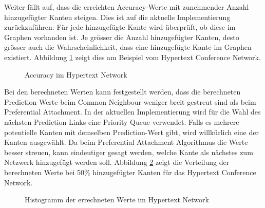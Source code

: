 Weiter fällt auf, dass die erreichten Accuracy-Werte mit zunehmender Anzahl hinzugefügter Kanten steigen.
Dies ist auf die aktuelle Implementierung zurückzuführen: Für jede hinzugefügte Kante wird überprüft, ob diese im Graphen vorhanden ist.
Je grösser die Anzahl hinzugefügter Kanten, desto grösser auch die Wahrscheinlichkeit, dass eine hinzugefügte Kante im Graphen existiert.
Abbildung \ref{fig_hypertext} zeigt dies am Beispiel vom Hypertext Conference Network.

\begin{figure}[h]
\centering
{}
\label{fig_hypertext}
\caption{Accuracy im Hypertext Network}
\end{figure}

Bei den berechneten Werten kann festgestellt werden, dass die berechneten Prediction-Werte beim Common Neighbour weniger breit gestreut sind als beim Preferential Attachment.
In der aktuellen Implementierung wird für die Wahl des nächsten Prediction Links eine Priority Queue verwendet. Falls es mehrere potentielle Kanten mit demselben Prediction-Wert gibt, wird willkürlich eine der Kanten ausgewählt.
Da beim Preferential Attachment Algorithmus die Werte besser streuen, kann eindeutiger gesagt werden, welche Kante als nächstes zum Netzwerk hinzugefügt werden soll.
Abbildung \ref{fig_histogram}
zeigt die Verteilung der berechneten Werte bei 50\% hinzugefügter Kanten für das Hypertext Conference Network.

\begin{figure}
    \centering
\label{fig_histogram}
\caption{Histogramm der errechneten Werte im Hypertext Network}
\end{figure}

